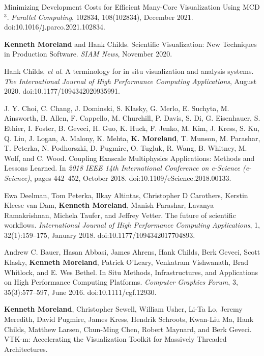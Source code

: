 \begin{enumerate}[label={[\arabic*]}, left=0pt]
  Minimizing Development Costs for Efficient Many-Core Visualization Using {MCD$^3$}.
  \emph{Parallel Computing}, 102834, 108(102834), December 2021.
  doi:10.1016/j.parco.2021.102834.
\item  %
  \textbf{Kenneth Moreland} and Hank Childs.
  Scientific Visualization: New Techniques in Production Software.
  \emph{SIAM News}, November 2020.
\item  %
  Hank Childs, \emph{et al}.
  A terminology for in situ visualization and analysis systems.
  \emph{The International Journal of High Performance Computing Applications}, August 2020.
  doi:10.1177/1094342020935991.
\item  %
  J. Y. Choi, C. Chang, J. Dominski, S. Klasky, G. Merlo, E. Suchyta, M. Ainsworth, B. Allen, F. Cappello, M. Churchill, P. Davis, S. Di, G. Eisenhauer, S. Ethier, I. Foster, B. Geveci, H. Guo, K. Huck, F. Jenko, M. Kim, J. Kress, S. Ku, Q. Liu, J. Logan, A. Malony, K. Mehta, \textbf{K. Moreland}, T. Munson, M. Parashar, T. Peterka, N. Podhorszki, D. Pugmire, O. Tugluk, R. Wang, B. Whitney, M. Wolf, and C. Wood.
  Coupling Exascale Multiphysics Applications: Methods and Lessons Learned.
  In \emph{2018 IEEE 14th International Conference on e-Science (e-Science)}, pages 442--452, October 2018.
  doi:10.1109/eScience.2018.00133.
\item  %
  Ewa Deelman, Tom Peterka, Ilkay Altintas, Christopher D Carothers, Kerstin Kleese van Dam, \textbf{Kenneth Moreland}, Manish Parashar, Lavanya Ramakrishnan, Michela Taufer, and Jeffrey Vetter.
  The future of scientific workflows.
  \emph{International Journal of High Performance Computing Applications}, 1, 32(1):159--175, January 2018.
  doi:10.1177/1094342017704893.
\item  %
  Andrew C. Bauer, Hasan Abbasi, James Ahrens, Hank Childs, Berk Geveci, Scott Klasky, \textbf{Kenneth Moreland}, Patrick O'Leary, Venkatram Vishwanath, Brad Whitlock, and E. Wes Bethel.
  In Situ Methods, Infrastructures, and Applications on High Performance Computing Platforms.
  \emph{Computer Graphics Forum}, 3, 35(3):577--597, June 2016.
  doi:10.1111/cgf.12930.
\item  %
  \textbf{Kenneth Moreland}, Christopher Sewell, William Usher, Li-Ta Lo, Jeremy Meredith, David Pugmire, James Kress, Hendrik Schroots, Kwan-Liu Ma, Hank Childs, Matthew Larsen, Chun-Ming Chen, Robert Maynard, and Berk Geveci.
  {VTK-m}: Accelerating the Visualization Toolkit for Massively Threaded Architectures.

\end{enumerate}
